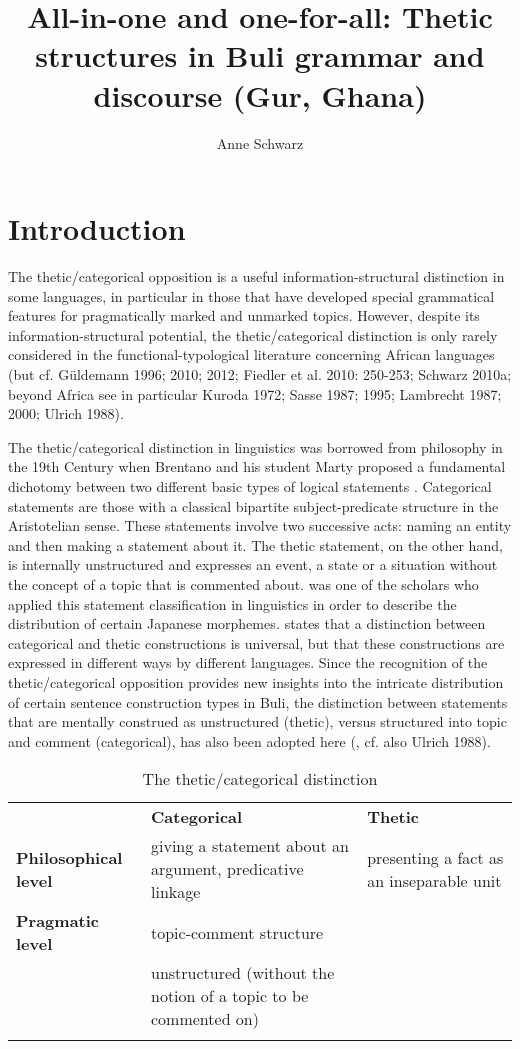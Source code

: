 \documentclass[output=paper]{langsci/langscibook}
\title{All-in-one and one-for-all: Thetic structures in Buli grammar and discourse (Gur, Ghana)}
\author{%
 Anne Schwarz \affiliation{Universidad Regional Amazónica IKIAM}
}
\begin{document}
 

\section{Introduction}

The thetic/categorical opposition is a useful information-structural distinction in some languages, in particular in those that have developed special grammatical features for pragmatically marked and unmarked topics. However, despite its information-structural potential, the thetic/categorical distinction is only rarely considered in the functional-typological literature concerning African languages (but cf. Güldemann 1996; 2010; 2012; Fiedler et al. 2010: 250-253; Schwarz 2010a; beyond Africa see in particular Kuroda 1972; Sasse 1987; 1995; Lambrecht 1987; 2000; Ulrich 1988). 

The thetic/categorical distinction in linguistics was borrowed from philosophy in the 19th Century when Brentano and his student Marty proposed a fundamental dichotomy between two different basic types of logical statements \citep[535]{Sasse1987}. Categorical statements are those with a classical bipartite subject-predicate structure in the Aristotelian sense. These statements involve two successive acts: naming an entity and then making a statement about it. The thetic statement, on the other hand, is internally unstructured and expresses an event, a state or a situation without the concept of a topic that is commented about. \citet{Kuroda1972} was one of the scholars who applied this statement classification in linguistics in order to describe the distribution of certain Japanese morphemes\textit{. }\citet[388]{Ulrich1988} states that a distinction between categorical and thetic constructions is universal, but that these constructions are expressed in different ways by different languages. Since the recognition of the thetic/categorical opposition provides new insights into the intricate distribution of certain sentence construction types in Buli, the distinction between statements that are mentally construed as unstructured (thetic), versus structured into topic and comment (categorical), has also been adopted here (, cf. also Ulrich 1988). 
 
\begin{table}
\caption{The thetic/categorical distinction}
\label{tab:1}

\begin{tabularx}{\textwidth}{XXX}
 & {\textbf{Categorical}} & {\textbf{Thetic }}\\
\lsptoprule
{\textbf{Philosophical level}} & {giving a statement about an argument, predicative linkage } & {presenting a fact as an inseparable unit}\\
{\textbf{Pragmatic level }} & {topic-comment structure}\\
& {unstructured (without the notion of a topic to be commented on)}\\
\lspbottomrule
\end{tabularx}
\end{table} 
\end{document}
